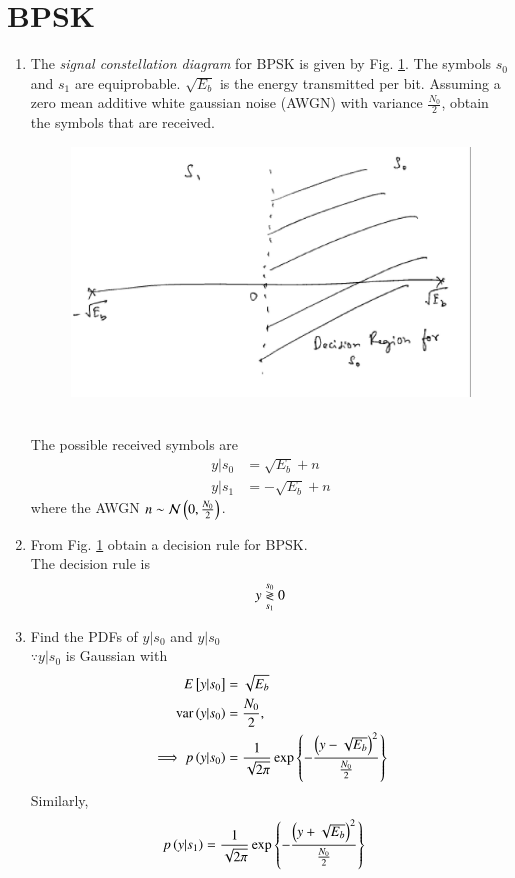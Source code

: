 \documentclass[journal,12pt,twocolumn]{IEEEtran}
\renewcommand\thesection{\arabic{section}}
\begin{document}
\section{BPSK}
\begin{enumerate}[label=\thesection.\arabic*.,ref=\thesection.\theenumi]

\item The {\em signal constellation diagram} for BPSK is given by Fig. \ref{fig:bpsk_const}.  The symbols $s_0$ and $s_1$ are equiprobable.  $\sqrt{E_b}$ is the energy transmitted per bit. Assuming a zero mean additive white gaussian noise (AWGN) with variance $\frac{N_0}{2}$,
obtain the symbols that are received.
%
\begin{figure}[!h]
\centering
\includegraphics[width=\columnwidth]{./figs/bpsk_const.eps}
\caption{}
\label{fig:bpsk_const}
\end{figure}
\\
\solution The possible received symbols are
\begin{align}
y|s_0 &= \sqrt{E_b} + n
\\
y|s_1 &= -\sqrt{E_b} + n
\end{align}
%
where the AWGN $n \sim \mathcal{N}\left(0,\frac{N_0}{2}\right)$.
%
\item

\label{prob:bpsk_decision}
From Fig. \ref{fig:bpsk_const} obtain a decision rule for BPSK.
\\
\solution The decision rule is
\begin{equation}
\label{eq:bsk_map_dec}
y \overset{s_0}{\underset{s_1}{\gtrless}} 0
\end{equation}
%
\item Find the PDFs of $y|s_0$ and $y|s_0$
\\
\solution $\because y|s_0$ is Gaussian with 
\begin{align}
E{}\left[y|s_0\right] &= \sqrt{E_b}
\\
\text{var}\left(y|s_0\right) &= \frac{N_0}{2},
\\
\implies p\left(y|s_0\right) &= \frac{1}{\sqrt{2\pi}}\exp\left\{-\frac{\left(y - \sqrt{E_b}\right)^2}{\frac{N_0}{2}}\right\}
\label{eq:bpsk_y0pdf}
\end{align}
%
Similarly,
\begin{align}
p\left(y|s_1\right) &= \frac{1}{\sqrt{2\pi}}\exp\left\{-\frac{\left(y + \sqrt{E_b}\right)^2}{\frac{N_0}{2}}\right\}
\label{eq:bpsk_y1pdf}
\end{align}


\end{enumerate}
\end{document}
